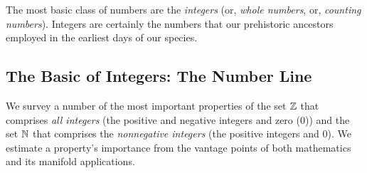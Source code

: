 The most basic class of numbers are the {\it integers}
(or, {\it whole numbers},
or, {\em counting numbers}).
%
Integers are certainly the numbers that our prehistoric ancestors
employed in the earliest days of our species.

\subsection{The Basic of Integers: The Number Line}
\label{sec:number-line}
%
We survey a number of the most important properties of the set
$\mathbb{Z}$ that comprises {\em all
  integers} (the positive and negative integers and zero ($0$)) and
the set $\mathbb{N}$ that
comprises the {\em nonnegative integers} (the positive integers and
$0$).  We estimate a property's importance from the vantage points of
both mathematics and its manifold applications.

